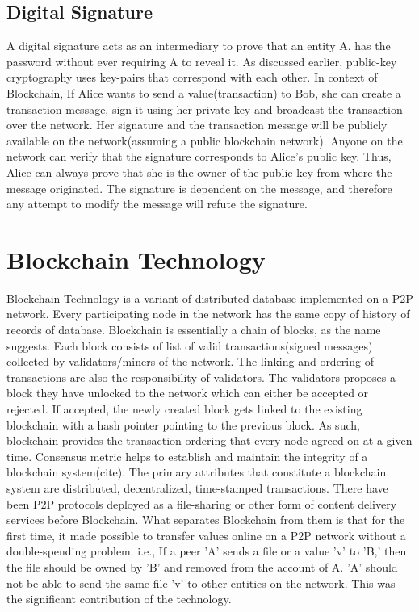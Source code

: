 \subsection{Digital Signature} \label{ss:digitalsignature}
A digital signature acts as an intermediary to prove that an entity A, has the
password without ever requiring A to reveal it. As discussed earlier,
public-key cryptography uses key-pairs that correspond with each other. In
context of Blockchain, If Alice wants to send a value(transaction) to Bob, she
can create a transaction message, sign it using her private key and broadcast
the transaction over the network. Her signature and the transaction message
will be publicly available on the network(assuming a public blockchain
network). Anyone on the network can verify that the signature corresponds to
Alice's public key. Thus, Alice can always prove that she is the owner of the
public key from where the message originated. The signature is dependent on the
message, and therefore any attempt to modify the message will refute the
signature.


\section{Blockchain Technology} \label{sec:blockchain}
Blockchain Technology is a variant of distributed database implemented on a P2P
network. Every participating node in the network has the same copy of history
of records of database. Blockchain is essentially a chain of blocks, as the
name suggests. Each block consists of list of valid transactions(signed
messages) collected by validators/miners of the network. The linking and
ordering of transactions are also the responsibility of validators. The
validators proposes a block they have unlocked to the network which can either
be accepted or rejected. If accepted, the newly created block gets linked to
the existing blockchain with a hash pointer pointing to the previous block. As
such, blockchain provides the transaction ordering that every node agreed on at
a given time. Consensus metric helps to establish and maintain the integrity
of a blockchain system(cite).
The primary attributes that constitute a blockchain system are distributed,
decentralized, time-stamped transactions.  
There have been P2P protocols deployed as a file-sharing or other form of
content delivery services before Blockchain. What separates Blockchain from
them is that for the first time, it made possible to transfer values online on
a P2P network without a double-spending problem. i.e., If a peer 'A' sends a
file or a value 'v' to 'B,' then the file should be owned by 'B' and removed
from the account of A. 'A' should not be able to send the same file 'v' to
other entities on the network. This was the significant contribution of the
technology. 


